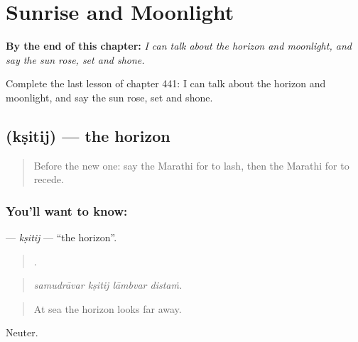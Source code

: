 
\chapter{Sunrise and Moonlight}
\label{ch:mr-sunrise-and-moonlight}

\begin{chapteropening}
\textbf{By the end of this chapter:} \emph{I can talk about the horizon and moonlight, and say the sun rose, set and shone.}

Complete the last lesson of chapter 441: I can talk about the horizon and moonlight, and say the sun rose, set and shone.
\end{chapteropening}

\section[\texorpdfstring{\mr{क्षितिज} (kṣitij)}{क्षितिज (kṣitij)}]{ (kṣitij) — the horizon}

\label{lesson:MR-C441-ksitij}



\begin{quote}
Before the new one: say the Marathi for to lash, then the Marathi for to recede.
\end{quote}

\subsection*{You'll want to know: }
\textbf{} — \emph{kṣitij} — \textquotedblleft{}the horizon\textquotedblright{}.

\begin{quote}
   .
\end{quote}

\begin{quote}
\emph{samudrāvar kṣitij lāmbvar distaṁ.}
\end{quote}

\begin{quote}
At sea the horizon looks far away.
\end{quote}

Neuter.


